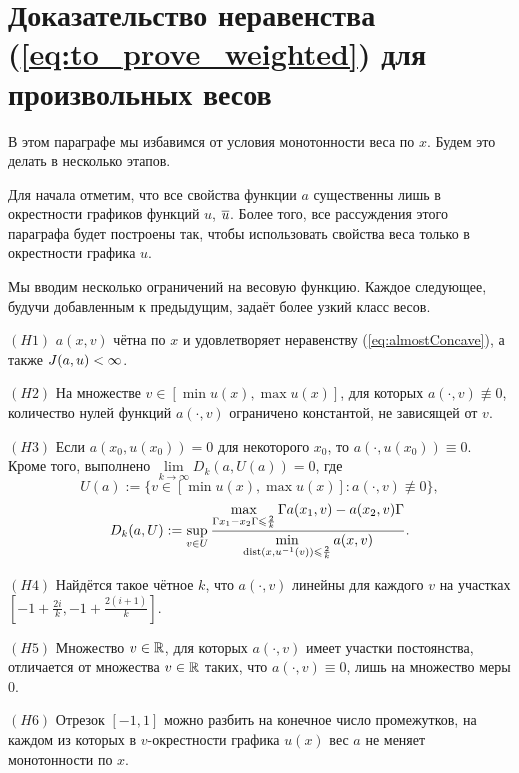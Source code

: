 \section{Доказательство неравенства (\ref{eq:to_prove_weighted}) для произвольных весов}
\label{sec:general_sobolev}

В этом параграфе мы избавимся от условия монотонности веса по $x$.
Будем это делать в несколько этапов.

Для начала отметим, что все свойства функции $a$ существенны лишь в окрестности графиков функций $u$, $\mon{u}$.
Более того, все рассуждения этого параграфа будет построены так, чтобы использовать свойства веса только в окрестности графика $u$.

Мы вводим несколько ограничений на весовую функцию.
Каждое следующее, будучи добавленным к предыдущим, задаёт более узкий класс весов. 

\bigskip

\smallskip
\noindent
$(H1)$ $a(x, v)$ чётна по $x$ и удовлетворяет неравенству (\ref{eq:almostConcave}), а также $J(a, u) < \infty$.
\smallskip

\bigskip
\noindent
$(H2)$ На множестве $v \in [\min u(x), \max u(x)]$, для которых $a(\cdot, v) \not\equiv 0$,
количество нулей функций $a(\cdot, v)$ ограничено константой, не зависящей от $v$.

\bigskip
\noindent
$(H3)$ Если $a(x_0, u(x_0)) = 0$ для некоторого $x_0$, то $a(\cdot, u(x_0)) \equiv 0$.
Кроме того, выполнено $\lim\limits_{k \to \infty} D_k(a, U(a)) = 0$, где
$$
U(a) := \{ v \in [\min u(x), \max u(x)]: a(\cdot, v) \not \equiv 0 \},
$$
\begin{equation}
\label{eq:wgen_bigD}
D_k(a, U) := \sup \limits_{v \in U}
\frac{\max \limits_{\abs{x_1 - x_2} \le \frac{2}{k}} \abs{a(x_1, v) - a(x_2, v)}}
{\min \limits_{\dist (x, u^{-1} (v)) \le \frac{2}{k}} a(x, v)}.
\end{equation}

\bigskip
\noindent
$(H4)$ Найдётся такое чётное $k$, что $a(\cdot, v)$ линейны для каждого $v$ на участках
$[-1 + \frac{2i}{k}, -1 + \frac{2(i + 1)}{k}]$.

\bigskip
\noindent
$(H5)$ Множество $v \in \mathbb R$, для которых $a(\cdot, v)$ имеет участки постоянства,
отличается от множества $v \in \mathbb R$ таких, что $a(\cdot, v) \equiv 0$,
лишь на множество меры $0$.

\bigskip
\noindent
$(H6)$ Отрезок $[-1, 1]$ можно разбить на конечное число промежутков,
на каждом из которых в $v$-окрестности графика $u(x)$ вес $a$ не меняет монотонности по $x$.

